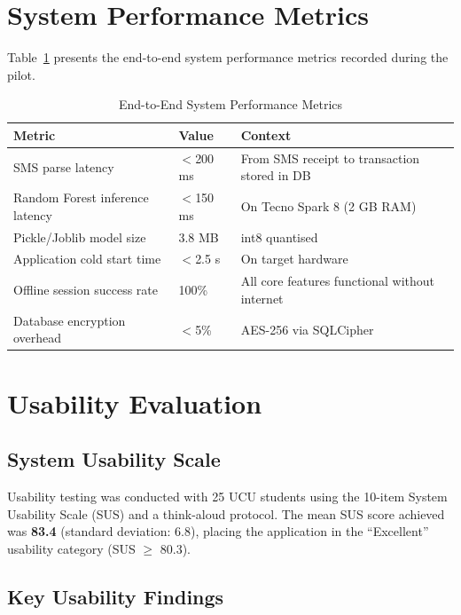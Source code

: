 \documentclass[12pt]{report}
\begin{document}
\section{System Performance Metrics}

Table~\ref{tab:system_perf} presents the end-to-end system performance metrics
recorded during the pilot.

\begin{table}[H]
\centering
\caption{End-to-End System Performance Metrics}
\label{tab:system_perf}
\begin{tabular}{p{5.5cm} p{3cm} p{4cm}}
\toprule
\textbf{Metric} & \textbf{Value} & \textbf{Context} \\
\midrule
SMS parse latency           & $<$200 ms & From SMS receipt to transaction stored in DB \\
Random Forest inference latency      & $<$150 ms & On Tecno Spark 8 (2 GB RAM) \\
Pickle/Joblib model size           & 3.8 MB    & int8 quantised \\
Application cold start time & $<$2.5 s  & On target hardware \\
Offline session success rate & 100\%     & All core features functional without internet \\
Database encryption overhead & $<$5\%    & AES-256 via SQLCipher \\
\bottomrule
\end{tabular}
\end{table}

\section{Usability Evaluation}

\subsection{System Usability Scale}

Usability testing was conducted with 25 UCU students using the 10-item System
Usability Scale (SUS) and a think-aloud protocol. The mean SUS score achieved was
\textbf{83.4} (standard deviation: 6.8), placing the application in the ``Excellent''
usability category (SUS $\geq$ 80.3).

\subsection{Key Usability Findings}
\end{document}
